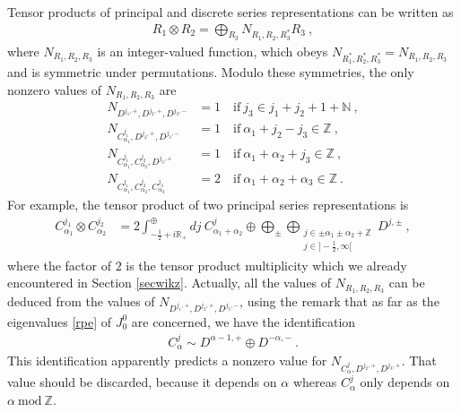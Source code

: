\documentclass[12pt, a4paper, notitlepage, twoside]{report}
\numberwithin{equation}{section}
\theoremstyle{break}
\begin{document}
Tensor products of principal and discrete series representations can be written as 
\begin{align}
 R_1\otimes R_2 = \bigoplus_{R_3} N_{R_1,R_2,R_3^*} R_3\ ,
\label{ror}
\end{align}
where $N_{R_1,R_2,R_3}$ is an integer-valued function, which obeys $N_{R_1^*,R_2^*,R_3^*}=N_{R_1,R_2,R_3}$ and is symmetric under permutations.
Modulo these symmetries, the only nonzero values of $N_{R_1,R_2,R_3}$ are
\begin{align}
N_{D^{j_1,+},D^{j_2,+},D^{j_3,-}} &= 1 \quad \text{if}\ j_3\in j_1+j_2+1+{\mathbb{N}}\ ,
\label{nddd}
\\
N_{C^{j_1}_{\alpha_1},D^{j_2,+},D^{j_3,-}} &= 1 \quad \text{if}\ \alpha_1+j_2-j_3\in{\mathbb{Z}}\ ,
\\
 N_{C^{j_1}_{\alpha_1},C^{j_2}_{\alpha_2},D^{j_3,+}} &= 1 \quad \text{if}\ \alpha_1+\alpha_2+j_3\in {\mathbb{Z}}\ ,
\\
N_{C^{j_1}_{\alpha_1},C^{j_2}_{\alpha_2},C^{j_3}_{\alpha_3}} &= 2 \quad \text{if}\ \alpha_1+\alpha_2+\alpha_3\in {\mathbb{Z}}\ .
\end{align}
For example, the tensor product of two principal series representations is
\begin{align}
 C^{j_1}_{\alpha_1}\otimes C^{j_2}_{\alpha_2} &= 2\int^\oplus_{-\frac12+i{\mathbb{R}}_+} dj\ C^j_{\alpha_1+\alpha_2} 
\oplus \bigoplus_\pm \bigoplus_{\substack{j\in \pm\alpha_1\pm\alpha_2+{\mathbb{Z}}\\ j\in]-\frac12, \infty[}} D^{j,\pm} \ ,
\label{coc}
\end{align}
where the factor of $2$ is the tensor product multiplicity which we already encountered in Section \ref{secwikz}.
Actually, all the values of $N_{R_1,R_2,R_3}$ can be deduced from the values of $N_{D^{j_1,+},D^{j_2,+},D^{j_3,-}}$, using the remark that as far as the eigenvalues \eqref{rpe} of $J^0_0$ are concerned, we have the identification
\begin{align}
 C^j_\alpha \sim D^{\alpha-1,+} \oplus D^{-\alpha,-}\ .
\label{cjdd}
\end{align}
This identification apparently predicts a nonzero value for $N_{C^j_\alpha,D^{j_2,+},D^{j_3,+}}$.
That value should be discarded, because it depends on $\alpha$ whereas $C^j_\alpha$ only depends on $\alpha\ \text{mod}\ {\mathbb{Z}}$.
\end{document}
